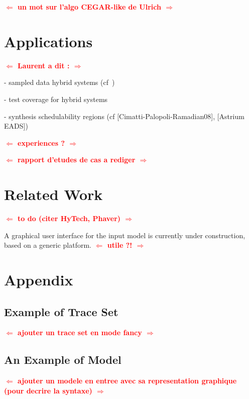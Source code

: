 \documentclass{llncs}
\newcommand{\commentaire}[1]{\textcolor{red}{\textbf{$\Leftarrow$  #1 $\Rightarrow$}}}
\begin{document}
\commentaire{un mot sur l'algo CEGAR-like de Ulrich}

\section{Applications}

\commentaire{Laurent a dit :}

- sampled data hybrid systems (cf~\cite{FK11})

- test coverage for hybrid systems

- synthesis schedulability regions (cf [Cimatti-Palopoli-Ramadian08], [Astrium EADS])

\commentaire{experiences ?}

\commentaire{rapport d'etudes de cas a rediger}



\section{Related Work}

\commentaire{to do (citer HyTech, Phaver)}

A graphical user interface for the input model is currently under construction, based on a generic platform. \commentaire{utile ?!}








\newpage


\appendix

\section*{Appendix}

\subsection*{Example of Trace Set}

\commentaire{ajouter un trace set en mode fancy}

\subsection*{An Example of Model}

\commentaire{ajouter un modele en entree avec sa representation graphique (pour decrire la syntaxe)}
\end{document}
